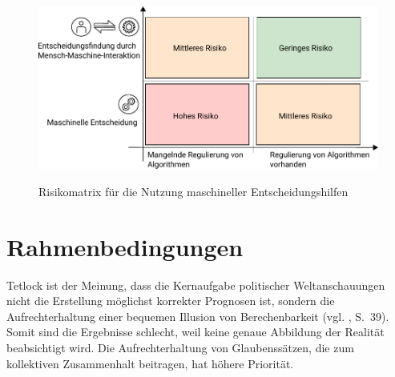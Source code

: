 \begin{figure}%
\centering
\caption{Risikomatrix für die Nutzung maschineller Entscheidungshilfen}
\includegraphics[scale=1.0]{Grafiken/Risk_Matrix_Ink.pdf} 
\label{pic:Risiko_Matrix}
\end{figure}

\section{Rahmenbedingungen}



Tetlock ist der Meinung, dass die Kernaufgabe politischer Weltanschauungen
nicht die Erstellung möglichst korrekter Prognosen ist, sondern die
Aufrechterhaltung einer bequemen Illusion von Berechenbarkeit
(vgl. \cite{Tetlock}, S.~39). Somit sind die Ergebnisse schlecht, weil keine
genaue Abbildung der Realität beabsichtigt wird. Die Aufrechterhaltung von
Glaubenssätzen, die zum kollektiven Zusammenhalt beitragen, hat höhere
Priorität.

